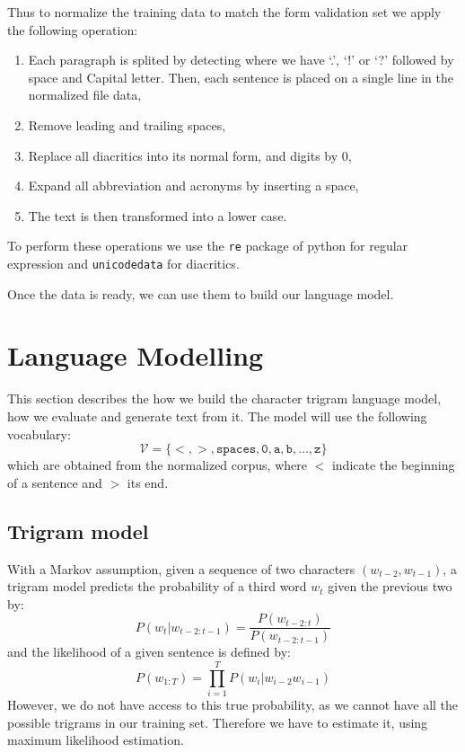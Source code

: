 Thus to normalize the training data to match the form validation set we apply the following operation:
\begin{enumerate}
    \item Each paragraph is splited by detecting where we have `.', `!' or  `?' followed by space and Capital letter. Then, each sentence is placed on a single line in the normalized file data,
    \item Remove leading and trailing spaces,
    \item Replace all diacritics into its normal form, and digits by 0,
    \item Expand all abbreviation and acronyms by inserting a space,
    \item The text is then transformed into a lower case.
\end{enumerate}
To perform these operations we use the \texttt{re} package of python for regular expression and \texttt{unicodedata} for diacritics.

Once the data is ready, we can use them to build our language model.
\section{Language Modelling}
This section describes the how we build the character trigram language model, how we evaluate and generate text from it. The model will use the following vocabulary:
\begin{equation}
    \mathcal{V} = \{ \mathtt{<, >, spaces, 0, a, b, \ldots, z} \}
\end{equation}
which are obtained from the normalized corpus, where $<$ indicate the beginning of  a sentence and $>$ its end.
\subsection{Trigram model}
With a Markov assumption, given a sequence of two characters $(w_{t-2}, w_{t-1})$, a trigram model predicts the probability of a third word $w_t$ given the previous two by:
\begin{equation}
    P(w_t|w_{t-2:t-1}) = \frac{P(w_{t-2:t})}{P(w_{t-2:t-1})}
\end{equation}
and the likelihood of a given sentence  is defined by:
\begin{equation}
    P(w_{1:T})=\prod_{i=1}^{T}P(w_i|w_{i-2}w_{i-1})
\end{equation}
However, we do not have access to this true probability, as we cannot have all the possible trigrams in our training set. Therefore we have to estimate it, using maximum likelihood estimation.
